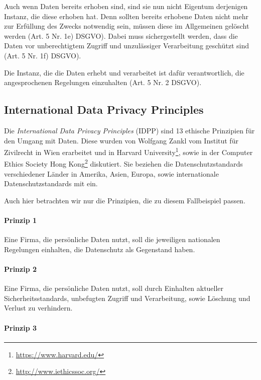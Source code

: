 Auch wenn Daten bereits erhoben sind, sind sie nun nicht Eigentum derjenigen Instanz, die diese erhoben hat. Denn sollten bereits erhobene Daten nicht mehr zur Erfüllung des Zwecks notwendig sein, müssen diese im Allgemeinen gelöscht werden (Art. 5 Nr. 1e) DSGVO).
Dabei muss sichergestellt werden, dass die Daten vor unberechtigtem Zugriff und unzulässiger Verarbeitung geschützt sind (Art. 5 Nr. 1f) DSGVO).

Die Instanz, die die Daten erhebt und verarbeitet ist dafür verantwortlich, die angesprochenen Regelungen einzuhalten (Art. 5 Nr. 2 DSGVO).


\subsection{International Data Privacy Principles}

Die \emph{International Data Privacy Principles}\cite{zankl_international_2014} (IDPP) sind 13 ethische Prinzipien für den Umgang mit Daten.
Diese wurden von Wolfgang Zankl vom Institut für Zivilrecht in Wien erarbeitet und in Harvard University\footnote{\url{https://www.harvard.edu/}}, sowie in der Computer Ethics Society Hong Kong\footnote{\url{http://www.iethicssoc.org/}} diskutiert.
Sie beziehen die Datenschutzstandards verschiedener Länder in Amerika, Asien, Europa, sowie internationale Datenschutzstandards mit ein.

Auch hier betrachten wir nur die Prinzipien, die zu diesem Fallbeispiel passen.

\paragraph*{Prinzip 1}

Eine Firma, die persönliche Daten nutzt, soll die jeweiligen nationalen Regelungen einhalten, die Datenschutz als Gegenstand haben.

\paragraph*{Prinzip 2}

Eine Firma, die persönliche Daten nutzt, soll durch Einhalten aktueller Sicherheitsstandards, unbefugten Zugriff und Verarbeitung, sowie Löschung und Verlust zu verhindern.

\paragraph*{Prinzip 3}


